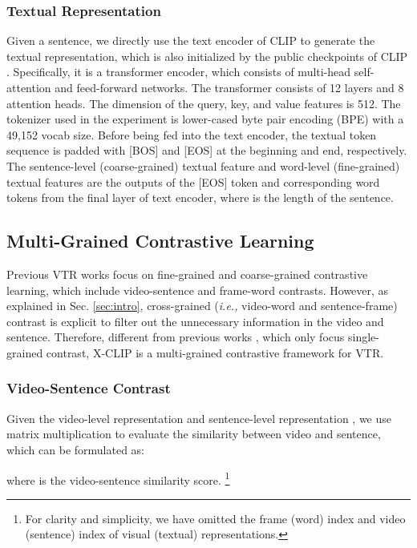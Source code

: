 \documentclass[sigconf]{acmart}
\begin{document}
\subsubsection{Textual Representation}
Given a sentence, we directly use the text encoder of CLIP to generate the textual representation, which is also initialized by the public checkpoints of CLIP \cite{radford2021learning}. Specifically, it is a transformer encoder, which consists of multi-head self-attention and feed-forward networks. The transformer consists of 12 layers and 8 attention heads. The dimension of the query, key, and value features is 512. The tokenizer used in the experiment is lower-cased byte pair encoding (BPE) \cite{sennrich2015neural} with a 49,152 vocab size. Before being fed into the text encoder, the textual token sequence is padded with [BOS] and [EOS] at the beginning and end, respectively. The sentence-level (coarse-grained) textual feature  and word-level (fine-grained) textual features  are the outputs of the [EOS] token and corresponding word tokens from the final layer of text encoder, where  is the length of the sentence.




\subsection{Multi-Grained Contrastive Learning} \label{sec:multigraied}

Previous VTR works \cite{luo2021clip4clip,lee2018stacked} focus on fine-grained and coarse-grained contrastive learning, which include video-sentence and frame-word contrasts. However, as explained in Sec. \ref{sec:intro}, cross-grained (\emph{i.e.,} video-word and sentence-frame) contrast is explicit to filter out the unnecessary information in the video and sentence. Therefore, different from previous works \cite{luo2021clip4clip,lee2018stacked,yao2021filip}, which only focus single-grained contrast, X-CLIP is a multi-grained contrastive framework for VTR.

\subsubsection{Video-Sentence Contrast}

Given the video-level representation  and sentence-level representation , we use matrix multiplication to evaluate the similarity between video and sentence, which can be formulated as:

where  is the video-sentence similarity score. \footnote{For clarity and simplicity, we have omitted the frame (word) index and video (sentence) index of visual (textual) representations.}
\end{document}
